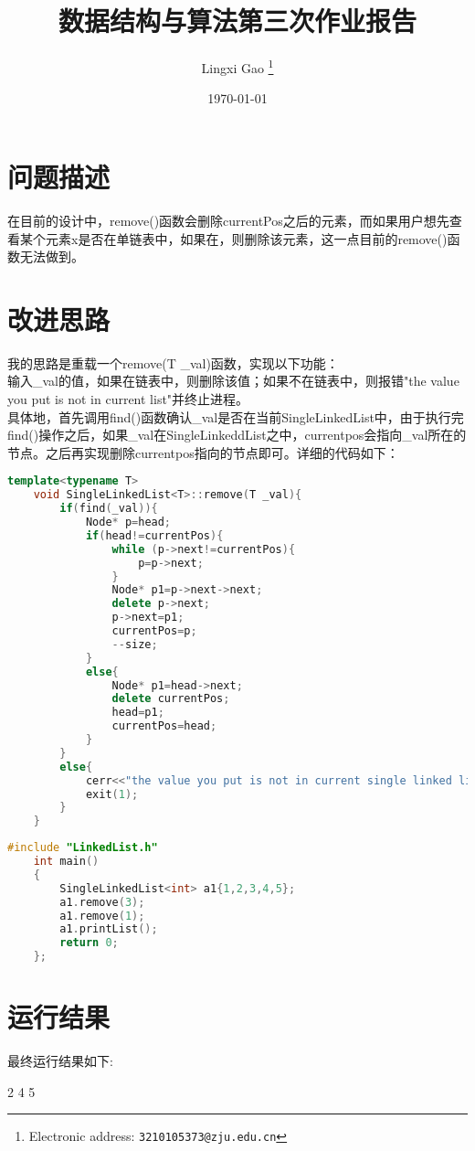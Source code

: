 \documentclass[a4paper]{article}
\begin{document}
\title{数据结构与算法第三次作业报告}


\author{Lingxi Gao
  \thanks{Electronic address: \texttt{3210105373@zju.edu.cn}}}


\date{\today}

\maketitle






\section*{问题描述}
在目前的设计中，remove()函数会删除currentPos之后的元素，而如果用户想先查看某个元素x是否在单链表中，如果在，则删除该元素，这一点目前的remove()函数无法做到。
\section*{改进思路}
我的思路是重载一个remove(T \_val)函数，实现以下功能：\\
输入\_val的值，如果在链表中，则删除该值；如果不在链表中，则报错"the value you put is not in current list"并终止进程。\\
具体地，首先调用find()函数确认\_val是否在当前SingleLinkedList中，由于执行完find()操作之后，如果\_val在SingleLinkeddList之中，currentpos会指向\_val所在的节点。之后再实现删除currentpos指向的节点即可。详细的代码如下：\\
\begin{lstlisting}[language=C++, caption={改进后的代码}]
	template<typename T>
	void SingleLinkedList<T>::remove(T _val){
		if(find(_val)){
			Node* p=head;
			if(head!=currentPos){
				while (p->next!=currentPos){
					p=p->next;
				}
				Node* p1=p->next->next;
				delete p->next;
				p->next=p1;
				currentPos=p;     
				--size;
			}
			else{
				Node* p1=head->next;
				delete currentPos;
				head=p1;
				currentPos=head;
			}
		}
		else{
			cerr<<"the value you put is not in current single linked list"<<endl;
			exit(1);
		}
	}
\end{lstlisting}
\begin{lstlisting}[language=C++, caption={测试}]
	#include "LinkedList.h"
	int main()
	{
		SingleLinkedList<int> a1{1,2,3,4,5};
		a1.remove(3);
	    a1.remove(1);
		a1.printList();
		return 0;
	};
\end{lstlisting}
\section*{运行结果}
最终运行结果如下:


2	4	5
\end{document}
